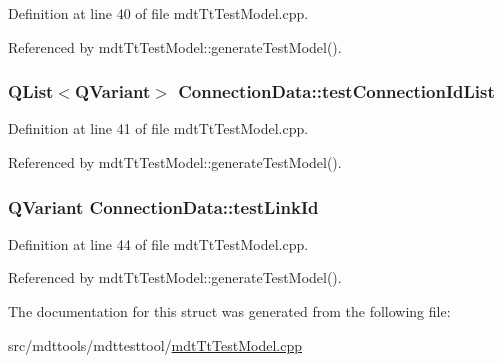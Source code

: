 Definition at line 40 of file mdt\-Tt\-Test\-Model.\-cpp.



Referenced by mdt\-Tt\-Test\-Model\-::generate\-Test\-Model().

\hypertarget{struct_connection_data_ad05beaa38c489196bb56c4ca45091679}{
\subsubsection[{test\-Connection\-Id\-List}]{\setlength{\rightskip}{0pt plus 5cm}Q\-List$<$Q\-Variant$>$ Connection\-Data\-::test\-Connection\-Id\-List}}\label{struct_connection_data_ad05beaa38c489196bb56c4ca45091679}


Definition at line 41 of file mdt\-Tt\-Test\-Model.\-cpp.



Referenced by mdt\-Tt\-Test\-Model\-::generate\-Test\-Model().

\hypertarget{struct_connection_data_a96c433ac0d7ac7d57e73d7edb37e5d32}{
\subsubsection[{test\-Link\-Id}]{\setlength{\rightskip}{0pt plus 5cm}Q\-Variant Connection\-Data\-::test\-Link\-Id}}\label{struct_connection_data_a96c433ac0d7ac7d57e73d7edb37e5d32}


Definition at line 44 of file mdt\-Tt\-Test\-Model.\-cpp.



Referenced by mdt\-Tt\-Test\-Model\-::generate\-Test\-Model().



The documentation for this struct was generated from the following file\-:\begin{DoxyCompactItemize}
\item 
src/mdttools/mdttesttool/\hyperlink{mdt_tt_test_model_8cpp}{mdt\-Tt\-Test\-Model.\-cpp}\end{DoxyCompactItemize}
